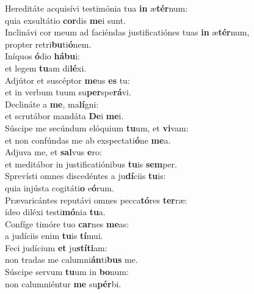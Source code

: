 \oddverse Hereditáte acquisívi testimónia tua \textbf{in} æ\textbf{tér}num:~\*\\
\oddverse quia exsultátio \textbf{cor}dis \textbf{me}i sunt.\\
\evenverse Inclinávi cor meum ad faciéndas justificatiónes tuas \textbf{in} æ\textbf{tér}num,~\*\\
\evenverse propter retri\textbf{bu}ti\textbf{ó}nem.\\
\oddverse Iníquos \textbf{ó}dio \textbf{há}\textbf{bu}i:~\*\\
\oddverse et legem \textbf{tu}am di\textbf{lé}xi.\\
\evenverse Adjútor et suscéptor \textbf{me}us \textbf{es} tu:~\*\\
\evenverse et in verbum tuum su\textbf{per}spe\textbf{rá}vi.\\
\oddverse Declináte a \textbf{me}, ma\textbf{lí}gni:~\*\\
\oddverse et scrutábor mandáta \textbf{De}i \textbf{me}i.\\
\evenverse Súscipe me secúndum elóquium \textbf{tu}um, et \textbf{vi}vam:~\*\\
\evenverse et non confúndas me ab exspectati\textbf{ó}ne \textbf{me}a.\\
\oddverse Adjuva me, et \textbf{sal}vus \textbf{e}ro:~\*\\
\oddverse et meditábor in justificatiónibus \textbf{tu}is \textbf{sem}per.\\
\evenverse Sprevísti omnes discedéntes a ju\textbf{dí}ciis \textbf{tu}is:~\*\\
\evenverse quia injústa cogitáti\textbf{o} e\textbf{ó}rum.\\
\oddverse Prævaricántes reputávi omnes pecca\textbf{tó}res \textbf{ter}ræ:~\*\\
\oddverse ídeo diléxi testi\textbf{mó}nia \textbf{tu}a.\\
\evenverse Confíge timóre tuo \textbf{car}nes \textbf{me}as:~\*\\
\evenverse a judíciis enim \textbf{tu}is \textbf{tí}mui.\\
\oddverse Feci judícium \textbf{et} ju\textbf{stí}\textbf{ti}am:~\*\\
\oddverse non tradas me calumni\textbf{án}ti\textbf{bus} me.\\
\evenverse Súscipe servum \textbf{tu}um in \textbf{bo}num:~\*\\
\evenverse non calumniéntur \textbf{me} su\textbf{pér}bi.\\
